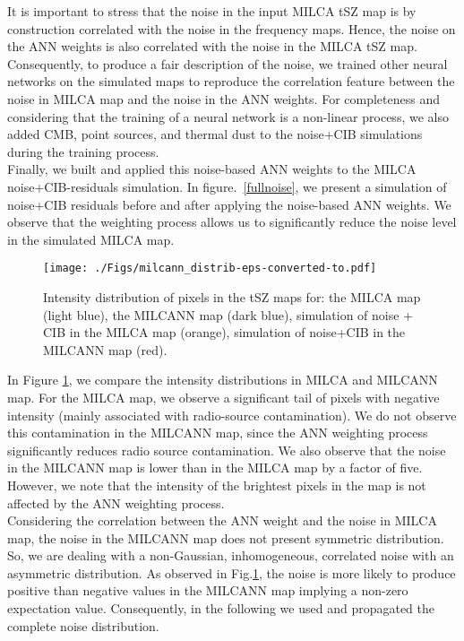 \documentclass[traditabstract,a4,twocolumn]{aa}
\begin{document}
It is important to stress that the noise in the input MILCA tSZ map is by construction correlated with the noise in the frequency maps. Hence, the noise on the ANN weights is also correlated with the noise in the MILCA tSZ map.  Consequently, to produce a fair description of
the noise, we trained other neural networks on the simulated
maps to reproduce the correlation feature between the noise in MILCA
map and the noise in the ANN weights.  
For completeness and considering that the training of a neural network is a non-linear process, we also added CMB, point
sources, and thermal dust to the noise+CIB simulations during the
training process.\\ Finally, we built and applied this noise-based ANN weights
to the MILCA noise+CIB-residuals simulation.  In figure.~\ref{fullnoise},
we present a simulation of noise+CIB residuals before and after applying
the noise-based ANN weights. We observe that the weighting process allows us
to significantly reduce the noise level in the simulated MILCA map.



\begin{figure}[!th]
\center
\texttt{[image: ./Figs/milcann\_distrib-eps-converted-to.pdf]}
\caption{Intensity distribution of pixels in the tSZ maps for: the MILCA map (light
  blue), the MILCANN map (dark blue), simulation of noise + CIB in the
  MILCA map (orange), simulation of noise+CIB in the MILCANN map
  (red).}
\label{distr}
\end{figure}

In Figure \ref{distr}, we compare the intensity distributions in MILCA
and MILCANN map.  For the MILCA map, we observe a significant tail of pixels with
negative intensity (mainly associated with radio-source contamination). We
do not observe this contamination in the MILCANN map, since the ANN
weighting process significantly reduces radio source contamination. We also
observe that the noise in the MILCANN map is lower than in the MILCA
map by a factor of five. However, we note that the intensity of the
brightest pixels in the map is not affected by the ANN weighting process.\\ 
Considering the
correlation between the ANN weight and the noise in MILCA map, the
noise in the MILCANN map does not present symmetric distribution. So,
we are dealing with a non-Gaussian, inhomogeneous, correlated noise
with an asymmetric distribution. As observed in Fig.\ref{distr}, the
noise is more likely to produce positive  than
negative values in the MILCANN map implying a non-zero expectation
value.  Consequently, in the following we used and propagated the
complete noise distribution.
\end{document}

